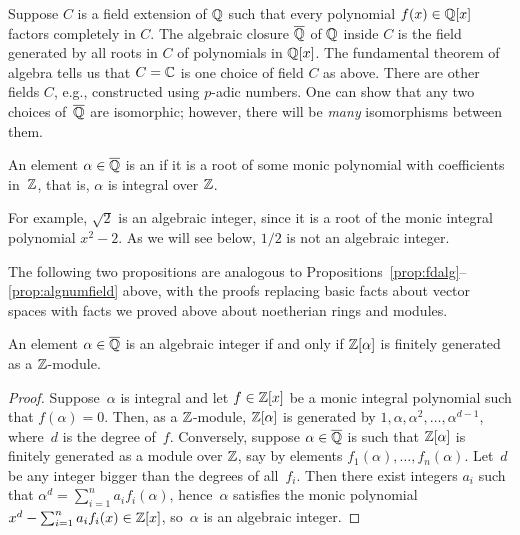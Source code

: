 Suppose $C$ is a field extension of $\mathbb{Q}$ such that every polynomial
$f(x)\in \mathbb{Q}[x]$ factors completely in $C$.
The algebraic closure $\overline{\mathbb{Q}}$ of $\mathbb{Q}$ inside $C$
is the  field generated by all roots in $C$ of polynomials
in $\mathbb{Q}[x]$.
The fundamental theorem of algebra tells us that
$C=\mathbb{C}$ is one choice of field $C$ as above.
There are other fields $C$, e.g., constructed using $p$-adic numbers.
One can show that any two choices of~$\overline{\mathbb{Q}}$ are isomorphic; however,
there will be {\em many} isomorphisms between them.

\begin{definition}
	An element $\alpha\in\overline{\mathbb{Q}}$ is an  if it
	is a root of some monic polynomial with coefficients in~$\mathbb{Z}$,
	that is, $\alpha$ is integral over $\mathbb{Z}$.
\end{definition}
For example, $\sqrt{2}$ is an algebraic integer, since it is a root
of the monic integral polynomial $x^2-2$. As we will see below,
$1/2$ is not an algebraic integer.

The following two propositions are analogous to
Propositions~\ref{prop:fdalg}--\ref{prop:algnumfield} above, with
the proofs replacing basic facts about vector spaces with facts we
proved above about noetherian rings and modules.

\begin{proposition}
	\label{prop:intfg}
	An element $\alpha\in\overline{\mathbb{Q}}$ is an algebraic integer if and
	only if $\mathbb{Z}[\alpha]$ is finitely generated as a $\mathbb{Z}$-module.
\end{proposition}
\begin{proof}
	Suppose~$\alpha$ is integral and let $f\in\mathbb{Z}[x]$ be a monic
	integral polynomial such that $f(\alpha)=0$.  Then, as a
	$\mathbb{Z}$-module, $\mathbb{Z}[\alpha]$ is generated by 
	$1,\alpha,\alpha^2,\ldots,\alpha^{d-1}$, where~$d$ is
	the degree of~$f$. Conversely, suppose $\alpha\in\overline{\mathbb{Q}}$ is such
	that $\mathbb{Z}[\alpha]$ is finitely generated as a module over $\mathbb{Z}$,
	say by elements $f_1(\alpha), \ldots, f_n(\alpha)$. Let~$d$ be
	any integer bigger than the degrees of all~$f_i$. Then there exist
	integers $a_i$ such that $\alpha^d = \sum_{i=1}^n a_i f_i(\alpha)$,
	hence~$\alpha$ satisfies the monic polynomial
	$x^d - \sum_{i=1}^n a_i f_i(x) \in \mathbb{Z}[x]$, so~$\alpha$
	is an algebraic integer.
\end{proof}

